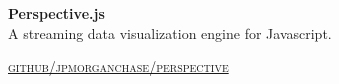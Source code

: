 {\raggedright
  \textbf{Perspective.js}
  \\

  A streaming data visualization engine for Javascript.

  \textsc{\small\href{http://github.com/jpmorganchase/perspective}{github/jpmorganchase/perspective}}
} \\
